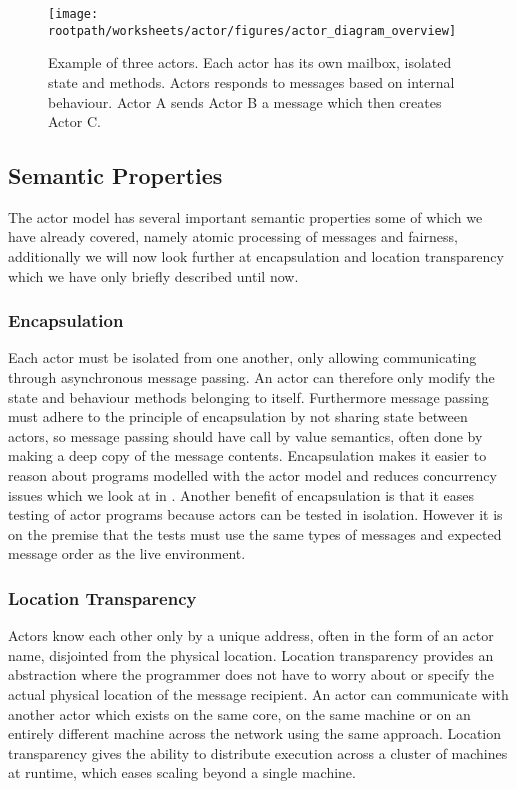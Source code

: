 \begin{figure}[h!]
\centering
\texttt{[image: \\rootpath/worksheets/actor/figures/actor\_diagram\_overview]}
\caption{Example of three actors. Each actor has its own mailbox, isolated state and methods. Actors responds to messages based on internal behaviour. Actor A sends Actor B a message which then creates Actor C.}\label{fig:actor_overview}
\end{figure}

\subsection{Semantic Properties}\label{ssec:actor_s_properties}
The actor model has several important semantic properties some of which we have already covered, namely atomic processing of messages and fairness, additionally we will now look further at encapsulation and location transparency which we have only briefly described until now\cite{karmani2011actors}.

\subsubsection{Encapsulation}
Each actor must be isolated from one another, only allowing communicating through asynchronous message passing. An actor can therefore only modify the state and behaviour methods belonging to itself. Furthermore message passing must adhere to the principle of encapsulation by not sharing state between actors, so message passing should have call by value semantics, often done by making a deep copy of the message contents\cite[p. 2]{karmani2009actor}. Encapsulation makes it easier to reason about programs modelled with the actor model\cite[p. 3]{karmani2009actor} and reduces concurrency issues which we look at in . Another benefit of encapsulation is that it eases testing of actor programs because actors can be tested in isolation. However it is on the premise that the tests must use the same types of messages and expected message order as the live environment\cite[p. 151]{sevenModels}.

\subsubsection{Location Transparency}
Actors know each other only by a unique address, often in the form of an actor name, disjointed from the physical location. Location transparency provides an abstraction where the programmer does not have to worry about or specify the actual physical location of the message recipient. An actor can communicate with another actor which exists on the same core, on the same machine or on an entirely different machine across the network using the same approach\cite[p. 3]{karmani2009actor}. Location transparency gives the ability to distribute execution across a cluster of machines at runtime, which eases scaling beyond a single machine.

